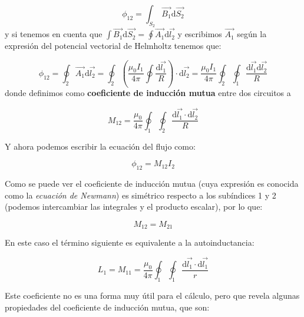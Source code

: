 \documentclass[12pt,a4paper]{article}
\newcommand{\parentesis}[1]{\left( #1  \right)}
\newcommand{\D}{\mathrm{d}}
\begin{document}
\begin{equation}
\phi_{12} = \int_{S_2} \vec{B_1} \D \vec{S_2}
\end{equation}
y si tenemos en cuenta que $\int \vec{B_1} \D \vec{S_2} = \oint \vec{A_1} \D \vec{l_2}$ y escribimos $\vec{A_1}$ según la expresión del potencial vectorial de Helmholtz tenemos que:

\begin{equation}
\phi_{12} = \oint_2 \vec{A_1} \D \vec{l_2} = \oint_2 \parentesis{\dfrac{\mu_0 I_1}{4 \pi} \oint \dfrac{\D \vec{l_1}}{R}} \cdot \D \vec{l_2} = \dfrac{\mu_0 I_1}{4 \pi} \oint_2 \oint_1 \dfrac{\D \vec{l_1} \D \vec{l_2}}{R}
\end{equation}
donde definimos como \textbf{coeficiente de inducción mutua} entre dos circuitos a

\begin{equation}
M_{12} = \dfrac{\mu_0}{4 \pi} \oint_1 \oint_2 \dfrac{\D \vec{l_1} \cdot \D \vec{l_2}}{R}
\end{equation}

Y ahora podemos escribir la ecuación del flujo como:

\begin{equation}
\phi_{12} = M_{12} I_2
\end{equation}

Como se puede ver el coeficiente de inducción mutua (cuya expresión es conocida como la \textit{ecuación de Newmann}) es simétrico respecto a los subíndices 1 y 2 (podemos intercambiar las integrales y el producto escalar), por lo que:

\begin{equation}
M_{12} = M_{21}
\end{equation}

En este caso el término siguiente es equivalente a la autoinductancia:

\begin{equation}
L_1 = M_{11} = \dfrac{\mu_0}{4 \pi} \oint_1 \oint_1 \dfrac{\D \vec{l_1} \cdot \D \vec{l_1} }{r}
\end{equation}

Este coeficiente no es una forma muy útil para el cálculo, pero que revela algunas propiedades del coeficiente de inducción mutua, que son:
\end{document}
